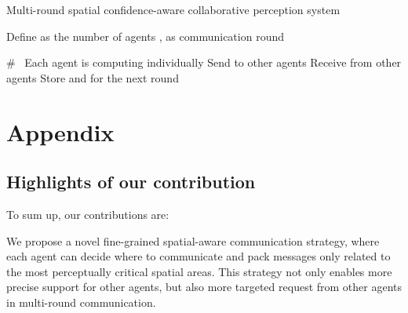 \documentclass{article}
\begin{document}
\begin{algorithm}[!t]
	\caption{Multi-round spatial confidence-aware collaborative perception system} 
	\begin{algorithmic}[1]
	    \State Define  as the number of agents ,  as communication round
	    \State {\color{blue} { \#~Initialization}}
	    \For {,}
	        \State 
	    \EndFor
	    
	    \For {,}
	        \For {,}  {\color{blue} { \#~ Each agent is computing individually}} 
	            \State  
	            \For {,}
	                \State {\color{blue} { \#~Message packing}} 
	                \State  {}
	                \If {}
    	                \State  
    	            \Else
    	                \State  
	                \EndIf
	                \State 
{}
	                \State {\color{blue} { \#~Communication graph learning }}
	                \If {}
    	                \State  
    	            \Else
    	                \State 
    	            \EndIf
    	        \EndFor
    	        \State {\color{blue} { \#~Communication}} \State Send  to other agents
    	        \State Receive  from other agents
    	        \State {\color{blue} { \#~Message fusion}}
	            \State  
	       \EndFor
	       \State Store  and  for the next round
	    \EndFor
    \State 
	\end{algorithmic} 
	\label{alg:system}
\end{algorithm}

\section{Appendix}

\subsection{Highlights of our contribution}
To sum up, our contributions are:

 We propose a novel fine-grained spatial-aware communication strategy, where each agent can decide where to communicate and pack messages only related to the most perceptually critical spatial areas. This strategy not only enables more precise support for other agents, but also more targeted request from other agents in multi-round communication.
\end{document}

